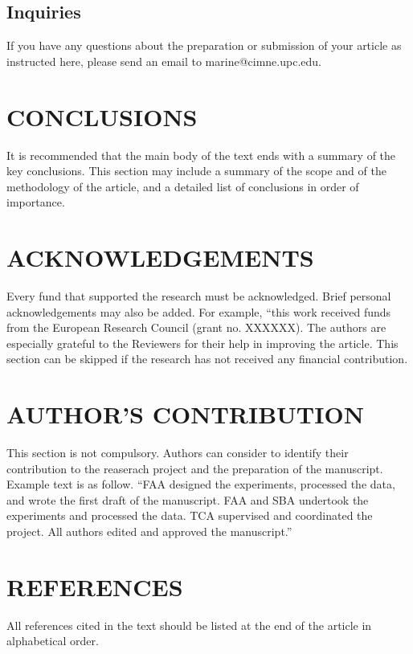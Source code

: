 \documentclass[A4paper,11pt]{marine_2023_Paper}
\begin{document}
\subsection{Inquiries}

 If you have any questions about the preparation or submission of your article as instructed here, please send an email to marine@cimne.upc.edu.


\section{CONCLUSIONS}

 It is recommended that the main body of the text ends with a summary of the key conclusions. This section may include a summary of the scope and of the methodology of the article, and a detailed list of conclusions in order of importance.

\section*{ACKNOWLEDGEMENTS}

 Every fund that supported the research must be acknowledged. Brief personal acknowledgements may also be added. For example, ``this work received funds from the European Research Council (grant no. XXXXXX). The authors are especially grateful to the Reviewers for their help in improving the article. This section can be skipped if the research has not received any financial contribution.

 \section*{AUTHOR'S CONTRIBUTION}

 This section is not compulsory. Authors can consider to identify their contribution to the reaserach project and the preparation of the manuscript. Example text is as follow. ``FAA designed the experiments, processed the data, and wrote the first draft of the manuscript. FAA and SBA undertook the experiments and processed the data. TCA supervised and coordinated the project. All authors edited and approved the manuscript.''


\section*{REFERENCES}
All references cited in the text should be listed at the end of the article in alphabetical order.
\end{document}
